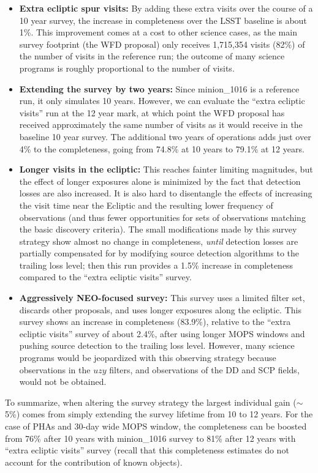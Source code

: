 \begin{itemize}
\item \textbf{Extra ecliptic spur visits:} By adding these extra visits over the course of a 10 year survey, the increase in completeness over the LSST baseline is about 1\%. This improvement comes at a cost to other science cases, as the main survey footprint (the WFD proposal) only receives 1,715,354 visits (82\%) of the number of visits in the reference run; the outcome of many science programs is roughly proportional to the number of visits.
\item \textbf{Extending the survey by two years:} Since minion\_1016 is a reference run, it only simulates 10 years.
However, we can evaluate the ``extra ecliptic visits'' run at the 12 year mark, at which point the WFD proposal has received approximately the same number of visits as it would receive in the baseline 10 year survey. The additional two years of operations adds just over 4\% to the completeness, going from 74.8\% at 10 years to 79.1\% at 12 years.
\item \textbf{Longer visits in the ecliptic:} This reaches fainter limiting magnitudes, but the effect of longer exposures alone is minimized by the fact that detection losses are also increased. It is also hard to disentangle the effects of increasing the visit time near the Ecliptic and the resulting lower frequency of observations (and thus fewer opportunities for sets of observations matching the basic discovery criteria). The small modifications made by this survey strategy show almost no change in completeness, {\it until} detection losses are partially compensated for by modifying source detection algorithms to the trailing loss level; then this run provides a 1.5\% increase in completeness compared to the ``extra ecliptic visits'' survey.
\item \textbf{Aggressively NEO-focused survey:} This survey uses a limited filter set, discards other proposals, and uses longer exposures along the ecliptic. This survey shows an increase in completeness (83.9\%), relative to the ``extra ecliptic visits'' survey of about 2.4\%, after using longer MOPS windows and pushing source detection to the trailing loss level.
However, many science programs would be jeopardized with this observing strategy because observations in the $uzy$ filters,
and observations of the DD and SCP fields, would not be obtained.
\end{itemize}

To summarize, when altering the survey strategy the largest individual gain ($\sim$5\%)
comes from simply extending the survey lifetime from 10 to 12 years. For the case of PHAs and 30-day wide MOPS window,
the completeness can be boosted from 76\% after 10 years with minion\_1016 survey to 81\% after 12 years with
``extra ecliptic visits'' survey (recall that this completeness estimates do not account for the contribution of known objects).

